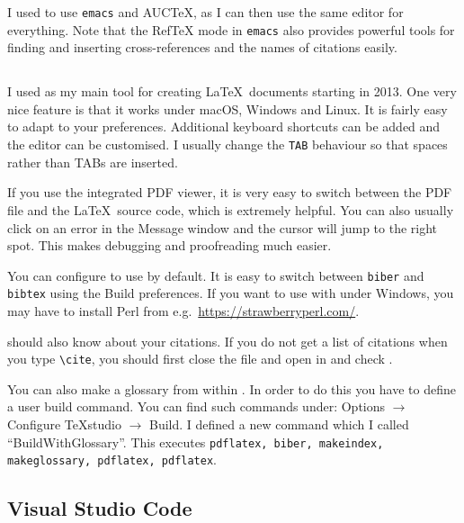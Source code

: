 I used to use \texttt{emacs} and AUCTeX, as I can
then use the same editor for everything. Note that the
RefTeX mode in \texttt{emacs} also provides powerful
tools for finding and inserting cross-references and the names of
citations easily.


\subsection{\TeXstudio}%
\label{sec:app:texstudio}

I used \TeXstudio as my main tool for creating \LaTeX\ documents starting in 2013.
One very nice feature is that it works under macOS, Windows and Linux.
It is fairly easy to adapt to your preferences.
Additional keyboard shortcuts can be added and the editor can be customised.
I usually change the \texttt{TAB} behaviour so that spaces rather than TABs are inserted.

If you use the integrated PDF viewer, it is very easy to switch between the PDF file and
the \LaTeX\ source code, which is extremely helpful.
You can also usually click on an error in the Message window and the cursor will jump to the right spot.
This makes debugging and proofreading much easier.

You can configure \TeXstudio to use  by default.
It is easy to switch between \texttt{biber} and \texttt{bibtex} using the Build preferences.
If you want to use  with \TeXstudio under Windows,
you may have to install Perl from e.g.\ \url{https://strawberryperl.com/}.

\TeXstudio should also know about your citations.
If you do not get a list of citations when you type \verb+\cite+,
you should first close the file and open 
in \TeXstudio {} and check .

You can also make a glossary from within \TeXstudio.
In order to do this you have to define a user build command.
You can find such commands under:
\textsf{Options} $\to$ \textsf{Configure TeXstudio} $\to$ \textsf{Build}.
I defined a new command which I called \enquote{BuildWithGlossary}.
This executes \texttt{pdflatex, biber, makeindex, makeglossary, pdflatex, pdflatex}.


\subsection{Visual Studio Code}%
\label{sec:app:vscode}%

